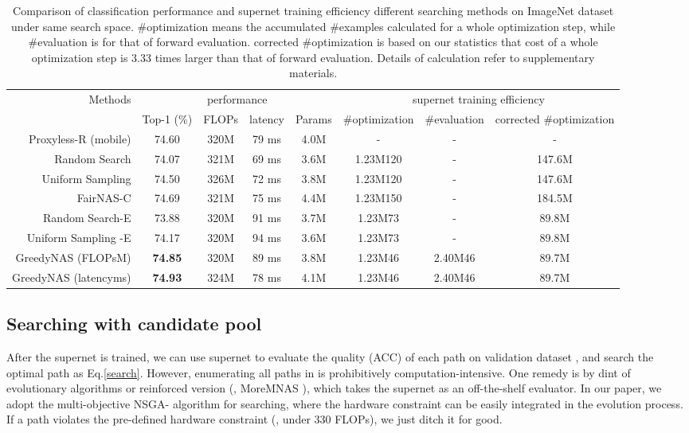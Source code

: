 \documentclass[10pt,twocolumn,letterpaper]{article}
\begin{document}
\begin{table*}[t]
	\caption{Comparison of classification performance and supernet training efficiency \wrt different searching methods on ImageNet dataset under same search space. \#optimization means the accumulated \#examples calculated for a whole optimization step, while \#evaluation is for that of forward evaluation. corrected \#optimization is based on our statistics that cost of a whole optimization step is 3.33 times larger than that of forward evaluation. Details of calculation refer to supplementary materials.}
	\label{tbl:samespace}
	\centering
	\small
	\vspace{-3mm}
	\begin{tabular}{r||c|c|c|c||c|c|c} 
		\multirow{2}{*}{Methods} & \multicolumn{4}{c||}{performance}  & \multicolumn{3}{c}{supernet training efficiency} 	\\	\cline{2-8}
		~& Top-1 (\%)&FLOPs &  latency & Params&\#optimization & \#evaluation & corrected \#optimization\\ \hline
		Proxyless-R (mobile) \cite{proxylessnas}&74.60&320M& 79 ms &4.0M&-&-&-\\ \hline
		Random Search&74.07&321M&69 ms&3.6M& 1.23M120&-&147.6M\\
		Uniform Sampling \cite{face++}& 74.50&326M& 72 ms &3.8M&1.23M120&-&147.6M\\ 
		FairNAS-C \cite{fairnas}& 74.69&321M&75 ms&4.4M&1.23M150&-&184.5M\\ \hline
		Random Search-E&73.88&320M&91 ms& 3.7M &1.23M73&-&89.8M\\
		Uniform Sampling \cite{face++}-E&74.17 &320M&94 ms&3.6M&1.23M73&-&89.8M\\ \hline 
		GreedyNAS (FLOPsM) &\textbf{74.85} &320M& 89 ms &3.8M&1.23M46&2.40M46&89.7M\\ 
		GreedyNAS (latencyms) & \textbf{74.93}&324M  & 78 ms &4.1M&1.23M46&2.40M46&89.7M \\ \hline
\end{tabular}	
	\vspace{-5mm}
\end{table*}







\subsection{Searching with candidate pool}
After the supernet is trained, we can use supernet to evaluate the quality (ACC) of each path on validation dataset , and search the optimal path  as Eq.\eqref{search}. However, enumerating all paths in  is prohibitively computation-intensive. One remedy is by dint of evolutionary algorithms \cite{face++} or reinforced version (\eg, MoreMNAS \cite{chu2019multi}), which takes the supernet as an off-the-shelf evaluator. In our paper, we adopt the multi-objective NSGA- \cite{deb2002fast} algorithm for searching, where the hardware constraint can be easily integrated in the evolution process. If a path violates the pre-defined hardware constraint (\eg, under 330 FLOPs), we just ditch it for good. 
\end{document}
